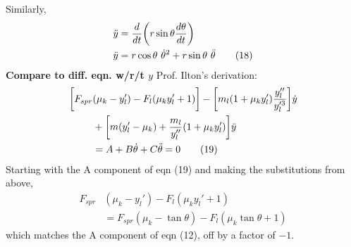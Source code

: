 \documentclass[12pt]{article}
\begin{document}
Similarly,
\begin{align}
    \ddot{y} & = \frac{d}{dt}\biggl( r \sin{\theta} \frac{d\theta}{dt}\biggr) \notag \\
    \ddot{y} & = r \cos{\theta} \ \dot{\theta}^2 + r \sin{\theta} \ \ddot{\theta} \tag{18}
\end{align}
\newline
\noindent \textbf{Compare to diff. eqn. w/r/t $y$}
\newline
Prof. Ilton's derivation:
\begin{align}
    \biggl[ F_{spr} & (\mu_k - y_l') - F_l(\mu_k y_l' + 1) \biggr] - \biggl[ m_l (1 + \mu_k y_l') \frac{y_l''}{y_l'^3} \biggr] \dot{y} \notag \\
    & + \biggl[ m (y_l' - \mu_k) + \frac{m_l}{y_l''} (1 + \mu_k y_l') \biggr] \ddot{y} \notag \\
    & = A + B \dot{\theta} + C \ddot{\theta} = 0 \tag{19}
\end{align}
\newline
Starting with the A component of eqn (19) and making the substitutions from above,
\begin{align*}
    F_{spr} & (\mu_k - y_l') - F_l(\mu_k y_l' + 1) \\
    & = F_{spr} (\mu_k - \tan{\theta}) - F_l(\mu_k \tan{\theta} + 1)
\end{align*}
which matches the A component of eqn (12), off by a factor of $-1$.
\end{document}
